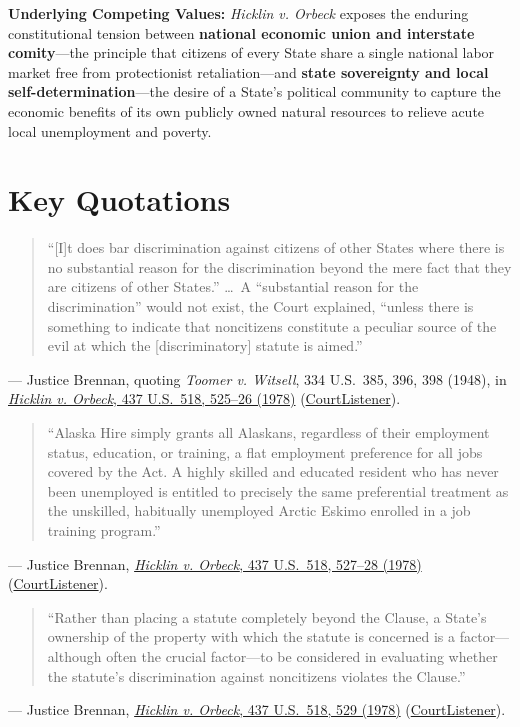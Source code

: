 \documentclass[12pt]{article}
\begin{document}
\textbf{Underlying Competing Values:} \textit{Hicklin v. Orbeck} exposes the enduring constitutional tension between \textbf{national economic union and interstate comity}---the principle that citizens of every State share a single national labor market free from protectionist retaliation---and \textbf{state sovereignty and local self-determination}---the desire of a State's political community to capture the economic benefits of its own publicly owned natural resources to relieve acute local unemployment and poverty.

\section{Key Quotations}

\begin{quote}
``[I]t does bar discrimination against citizens of other States where there is no substantial reason for the discrimination beyond the mere fact that they are citizens of other States.'' \ldots\ A ``substantial reason for the discrimination'' would not exist, the Court explained, ``unless there is something to indicate that noncitizens constitute a peculiar source of the evil at which the [discriminatory] statute is aimed.''
\end{quote}
\noindent --- Justice Brennan, quoting \textit{Toomer v. Witsell}, 334 U.S.\ 385, 396, 398 (1948), in \href{https://supreme.justia.com/cases/federal/us/437/518/}{\textit{Hicklin v. Orbeck}, 437 U.S.\ 518, 525--26 (1978)} (\href{https://www.courtlistener.com/opinion/109911/hicklin-v-orbeck/}{CourtListener}).

\begin{quote}
``Alaska Hire simply grants all Alaskans, regardless of their employment status, education, or training, a flat employment preference for all jobs covered by the Act. A highly skilled and educated resident who has never been unemployed is entitled to precisely the same preferential treatment as the unskilled, habitually unemployed Arctic Eskimo enrolled in a job training program.''
\end{quote}
\noindent --- Justice Brennan, \href{https://supreme.justia.com/cases/federal/us/437/518/}{\textit{Hicklin v. Orbeck}, 437 U.S.\ 518, 527--28 (1978)} (\href{https://www.courtlistener.com/opinion/109911/hicklin-v-orbeck/}{CourtListener}).

\begin{quote}
``Rather than placing a statute completely beyond the Clause, a State's ownership of the property with which the statute is concerned is a factor---although often the crucial factor---to be considered in evaluating whether the statute's discrimination against noncitizens violates the Clause.''
\end{quote}
\noindent --- Justice Brennan, \href{https://supreme.justia.com/cases/federal/us/437/518/}{\textit{Hicklin v. Orbeck}, 437 U.S.\ 518, 529 (1978)} (\href{https://www.courtlistener.com/opinion/109911/hicklin-v-orbeck/}{CourtListener}).
\end{document}
